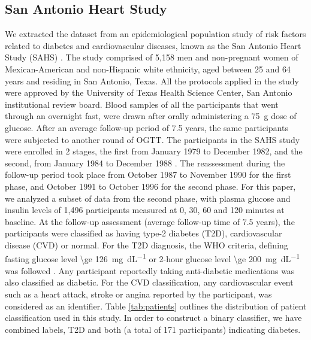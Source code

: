 \documentclass[a4paper,twoside]{article}
\begin{document}
\subsection{San Antonio Heart Study}
%
We extracted the dataset from an epidemiological population study of risk factors related to diabetes and cardiovascular diseases, known as the San Antonio Heart Study (SAHS) \cite{burke_rapid_1999,lorenzo_trend_2006}. The study comprised of 5,158 men and non-pregnant women of Mexican-American and non-Hispanic white ethnicity, aged between \num{25} and \num{64} years and residing in San Antonio, Texas. All the protocols applied in the study were approved by the University of Texas Health Science Center, San Antonio institutional review board. Blood samples of all the participants that went through an overnight fast, were drawn after orally administering a \SI{75}{\gram} dose of glucose.
After an average follow-up period of \num{7.5} years, the same participants were subjected to another round of OGTT.  The participants in the SAHS study were enrolled in 2 stages, the first from January \num{1979} to December \num{1982}, and the second, from January \num{1984} to December \num{1988} \cite{haffner_hyperinsulinemia_1986}. The reassessment during the follow-up period took place from October \num{1987} to November \num{1990} for the first phase, and October \num{1991} to October \num{1996} for the second phase. For this paper, we analyzed a subset of data from the second phase, with plasma glucose and insulin levels of 1,496 participants  measured at \num{0}, \num{30}, \num{60} and \num{120} minutes at baseline. At the follow-up assessment (average follow-up time of 7.5 years), the participants were classified as having type-2 diabetes (T2D), cardiovascular disease (CVD) or normal. For the T2D diagnosis, the WHO criteria, defining fasting glucose level \SI[round-mode = off,group-separator = {,}]{\ge 126}{\milli\gram\per\deci\liter} or 2-hour glucose level \SI[round-mode = off,group-separator = {,}]{\ge 200}{\milli\gram\per\deci\liter} was followed \cite{wei_effects_1998}. Any participant reportedly taking anti-diabetic medications was also classified as diabetic. For the CVD classification, any cardiovascular event such as a heart attack, stroke or angina reported by the participant, was considered as an identifier. Table \ref{tab:patients} outlines the distribution of patient classification used in this study. In order to construct a binary classifier, we have combined labels, T2D and both (a total of \num{171} participants) indicating diabetes.
%
\end{document}

